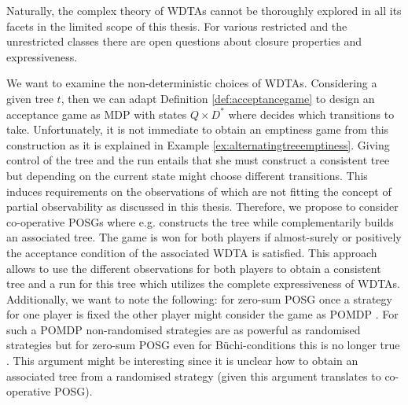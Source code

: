 Naturally, the complex theory of \acp{WDTA} cannot be thoroughly explored in
all its facets in the limited scope of this thesis. For various restricted and
the unrestricted classes there are open questions about closure properties and
expressiveness.

We want to examine the non-deterministic choices of \acp{WDTA}. Considering a
given tree $t$, then we can adapt Definition \ref{def:acceptancegame} to design
an acceptance game as \ac{MDP} with states $Q\times D^{*}$ where \eve{} decides
which transitions to take. Unfortunately, it is not immediate to obtain an
emptiness game from this construction as it is explained in Example
\ref{ex:alternatingtreeemptiness}. Giving \eve{} control of the tree and the
run entails that she must construct a consistent tree but depending on the
current state might choose different transitions. This induces requirements on
the observations of \eve{} which are not fitting the concept of partial
observability as discussed in this thesis. Therefore, we propose to consider
co-operative \acp{POSG} where e.g. \eve{} constructs the tree while \adam{}
complementarily builds an associated tree. The game is won for both players if
almost-surely or positively the acceptance condition of the associated
\ac{WDTA} is satisfied. This approach allows to use the different observations
for both players to obtain a consistent tree and a run for this tree which
utilizes the complete expressiveness of \acp{WDTA}. Additionally, we want to
note the following: for zero-sum \ac{POSG} once a strategy for one player is
fixed the other player might consider the game as \ac{POMDP}
\cite{AlgorithmsForPOSG}. For such a \ac{POMDP} non-randomised strategies are
as powerful as randomised strategies but for zero-sum \ac{POSG} even for
Büchi-conditions this is no longer true \cite{RandomnessForFree}. This argument
might be interesting since it is unclear how to obtain an associated tree from
a randomised strategy (given this argument translates to co-operative
\ac{POSG}).

